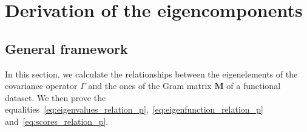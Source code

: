 \section{Derivation of the eigencomponents} %
\label{sec:derivation_of_the_eigencomponents}

\subsection{General framework} %
\label{sub:general_framework}
In this section, we calculate the relationships between the eigenelements of the covariance operator $\Gamma$ and the ones of the Gram matrix $\mathbf{M}$ of a functional dataset. We then prove the equalities~\eqref{eq:eigenvalues_relation_p},~\eqref{eq:eigenfunction_relation_p} and~\eqref{eq:scores_relation_p}.

